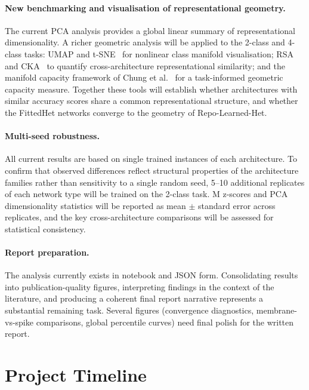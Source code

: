 \documentclass[12pt,twoside]{report}
\begin{document}
\paragraph{New benchmarking and visualisation of representational geometry.}
The current PCA analysis provides a global linear summary of representational
dimensionality. A richer geometric analysis will be applied to the 2-class and
4-class tasks: UMAP and t-SNE~\cite{mcinnes2018, vandermaaten2008} for nonlinear
class manifold visualisation; RSA~\cite{kriegeskorte2008} and
CKA~\cite{kornblith2019} to quantify cross-architecture representational similarity;
and the manifold capacity framework of Chung et al.~\cite{chung2018} for a
task-informed geometric capacity measure. Together these tools will establish whether
architectures with similar accuracy scores share a common representational structure,
and whether the FittedHet networks converge to the geometry of Repo-Learned-Het.

\paragraph{Multi-seed robustness.}
All current results are based on single trained instances of each 
architecture. To confirm that observed differences reflect structural 
properties of the architecture families rather than sensitivity to a single 
random seed, 5--10 additional replicates of each network type will be trained 
on the 2-class task. M z-scores and PCA dimensionality statistics will be 
reported as mean $\pm$ standard error across replicates, and the key 
cross-architecture comparisons will be assessed for statistical consistency.

\paragraph{Report preparation.}
The analysis currently exists in notebook and JSON form. Consolidating 
results into publication-quality figures, interpreting findings in the 
context of the literature, and producing a coherent final report narrative 
represents a substantial remaining task. Several figures (convergence 
diagnostics, membrane-vs-spike comparisons, global percentile curves) 
need final polish for the written report.

\section{Project Timeline}
\end{document}
